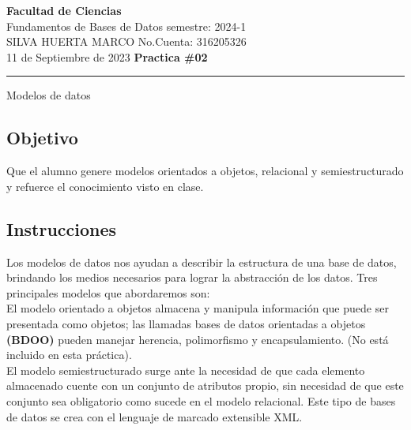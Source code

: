 \documentclass[a4paper,12pt]{article}
\begin{document}
\pagecolor{black}
\color{white}

\thispagestyle{firstpage} %
\noindent
\large\textbf{Facultad de Ciencias} \\
Fundamentos de Bases de Datos \hfill semestre: 2024-1 \\
\textsc{SILVA HUERTA MARCO}   \hfill No.Cuenta: 316205326    \\
11 de Septiembre de 2023      \hfill \textbf{Practica \#02}    \\
\noindent\rule{7.3in}{2.8pt}

\begin{center}
\Large{Modelos de datos}
\end{center}

\subsection*{Objetivo}
Que el alumno genere modelos orientados a objetos, relacional y semiestructurado y
refuerce el conocimiento visto en clase.

\subsection*{Instrucciones}

Los modelos de datos nos ayudan a describir la estructura de una base de datos, brindando
los medios necesarios para lograr la abstracción de los datos. Tres principales modelos que
abordaremos son:\\

El modelo orientado a objetos almacena y manipula información que puede ser presentada 
como objetos; las llamadas bases de datos orientadas a objetos \textbf{(BDOO)} pueden manejar
herencia, polimorfismo y encapsulamiento. (No está incluido en esta práctica).\\

El modelo semiestructurado surge ante la necesidad de que cada elemento almacenado
cuente con un conjunto de atributos propio, sin necesidad de que este conjunto sea
obligatorio como sucede en el modelo relacional. Este tipo de bases de datos se crea con el
lenguaje de marcado extensible XML.

\newpage
\thispagestyle{fancy} %
\end{document}

